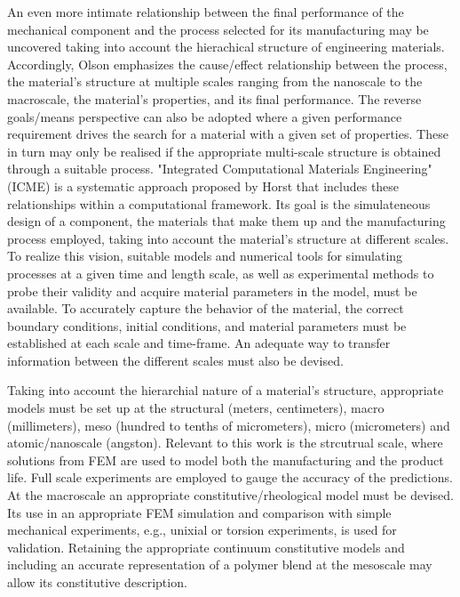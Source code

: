 An even more intimate relationship between the final performance of the mechanical component and the process selected for its manufacturing may be uncovered taking into account the hierachical structure of engineering materials.
Accordingly, Olson \citep{olsonDesigningNewMaterial2000} emphasizes the cause/effect relationship between the process, the material's structure at multiple scales ranging from the nanoscale to the macroscale, the material's properties, and its final performance.
The reverse goals/means perspective can also be adopted where a given performance requirement drives the search for a material with a given set of properties.
These in turn may only be realised if the appropriate multi-scale structure is obtained through a suitable process.
"Integrated Computational Materials Engineering" (ICME) is a systematic approach proposed by Horst \citep{horstemeyerCradletograveSimulationbasedDesign2003} that includes these relationships within a computational framework.
Its goal is the simulateneous design of a component, the materials that make them up and the manufacturing process employed, taking into account the material's structure at different scales.
To realize this vision, suitable models and numerical tools for simulating processes at a given time and length scale, as well as experimental methods to probe their validity and acquire material parameters in the model, must be available.
To accurately capture the behavior of the material, the correct boundary conditions, initial conditions, and material parameters must be established at each scale and time-frame.
An adequate way to transfer information between the different scales must also be devised.

Taking into account the hierarchial nature of a material's structure, appropriate models must be set up at the structural (meters, centimeters), macro (millimeters), meso (hundred to tenths of micrometers), micro (micrometers) and atomic/nanoscale (angston).
Relevant to this work is the strcutrual scale, where solutions from FEM are used to model both the manufacturing and the product life.
Full scale experiments are employed to gauge the accuracy of the predictions.
At the macroscale an appropriate constitutive/rheological model must be devised.
Its use in an appropriate FEM simulation and comparison with simple mechanical experiments, e.g., unixial or torsion experiments, is used for validation.
Retaining the appropriate continuum constitutive models and including an accurate representation of a polymer blend at the mesoscale may allow its constitutive description.


